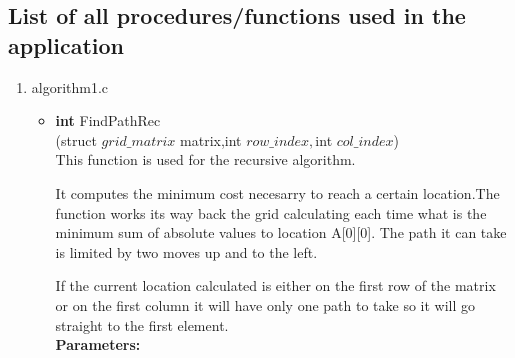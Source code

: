 \documentclass{article}
\begin{document}
\subsection{List of all procedures/functions used in the application}
\begin{enumerate}
    \item algorithm1.c
   \begin{itemize}
       \item \textbf{int} FindPathRec\\(struct $grid\_matrix$ matrix,int $row\_index,$int $ col\_index$)\\
       This function is used for the recursive algorithm.
       \par It computes the minimum cost necesarry to reach a certain location.The function works its way back the grid calculating each time what is the\\ minimum sum of absolute values to location A[0][0].
       The path it can take is limited by two moves up and to the left.
       \par If the current location calculated is either on the first row of the matrix or on the first column it will have only one path to take so it will go straight to the first element.\\
       \textbf {Parameters:}
       

\end{itemize}
\end{enumerate}
\end{document}
